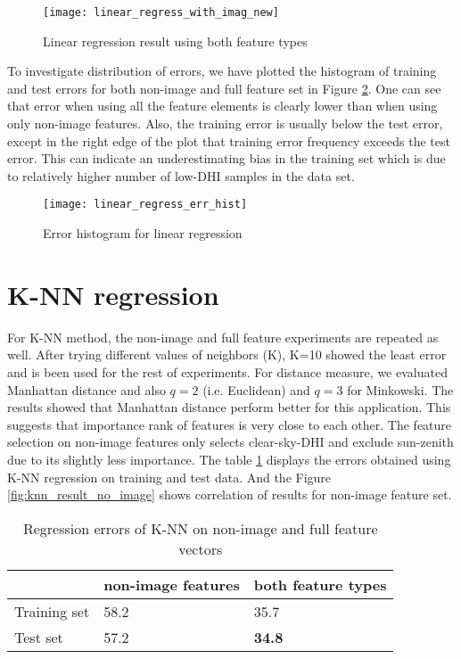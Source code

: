 \begin{figure}[h!]
\caption{Linear regression result using both feature types}
\label{fig:ln_result_all}
\texttt{[image: linear\_regress\_with\_imag\_new]}
\centering
\end{figure}

To investigate distribution of errors, we have plotted the histogram of training and test errors for both non-image and full feature set in Figure \ref{fig:ln_result_hist}. One can see that error when using all the feature elements is clearly lower than when using only non-image features. Also, the training error is usually below the test error, except in the right edge of the plot that training error frequency exceeds the test error. This can indicate an underestimating bias in the training set which is due to relatively higher number of low-DHI samples in the data set.

\begin{figure}[h!]
\caption{Error histogram for linear regression}
\label{fig:ln_result_hist}
\texttt{[image: linear\_regress\_err\_hist]}
\centering
\end{figure}

\section{K-NN regression}
For K-NN method, the non-image and full feature experiments are repeated as well. After trying different values of neighbors (K), K=10 showed the least error and is been used for the rest of experiments. For distance measure, we evaluated Manhattan distance and also $q=2$ (i.e. Euclidean) and $q=3$ for Minkowski. The results showed that Manhattan distance perform better for this application. This suggests that importance rank of features is very close to each other. The feature selection on non-image features only selects clear-sky-DHI and exclude sun-zenith due to its slightly less importance. The table \ref{table:rmse_knn} displays the errors obtained using K-NN regression on training and test data. And the Figure \ref{fig:knn_result_no_image} shows correlation of results for non-image feature set.

\begin{table}[h!]
\centering
\begin{tabular}{ |p{2.5cm}||p{4cm}|p{4cm}|  }
\hline
 &non-image features& both feature types\\
 \hline
 Training set &   58.2  & 35.7 \\
 Test set&   57.2  & \textbf{34.8} \\
 \hline
\end{tabular}
\caption{Regression errors of K-NN on non-image and full feature vectors}
\label{table:rmse_knn}
\end{table}

